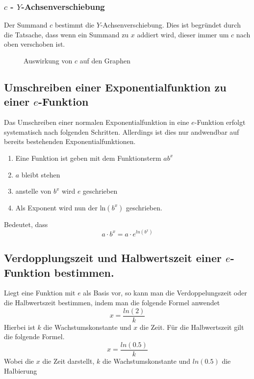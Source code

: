 \pagebreak
\subsubsection{$c$ - $Y$-Achsenverschiebung}\label{sec:e-Funktion/Umformung von der normalen Exponentialfunktion zu der E-Funktion/Normalform/c - Y-Achsenverschiebung}
Der Summand $c$ bestimmt die $Y$-Achsenverschiebung. Dies ist begründet durch die Tatsache, dass wenn ein Summand zu $x$ addiert wird, dieser immer um $c$ nach oben verschoben ist. 
\begin{figure}[h]
\centering
	\caption{Auswirkung von $c$ auf den Graphen}
\end{figure}
\pagebreak
\subsection{Umschreiben einer Exponentialfunktion zu einer $e$-Funktion}
Das Umschreiben einer normalen Exponentialfunktion in eine $e$-Funktion erfolgt systematisch nach folgenden Schritten. Allerdings ist dies nur andwendbar auf bereits bestehenden Exponentialfunktionen.
\begin{enumerate}
	\item Eine Funktion ist geben mit dem Funktionsterm $ab^x$
	\item $a$ bleibt stehen
	\item anstelle von $b^x$ wird $e$ geschrieben
	\item Als Exponent wird nun der $\mathrm {ln}(b^x)$ geschrieben. 
\end{enumerate}
Bedeutet, dass \[a\cdot b^x=a\cdot e^{ln(b^x)}\]

\subsection{Verdopplungszeit und Halbwertszeit einer $e$-Funktion bestimmen.}
Liegt eine Funktion mit $e$ als Basis vor, so kann man die Verdoppelungszeit oder die Halbwertszeit bestimmen, indem man die folgende Formel anwendet
\[x=\frac{ln(2)}{k}\]
Hierbei ist $k$ die Wachstumskonstante und $x$ die Zeit. Für die Halbwertszeit gilt die folgende Formel.
\[x=\frac{ln(0.5)}{k}\]
Wobei die $x$ die Zeit darstellt, $k$ die Wachstumskonstante und $ln(0.5)$ die Halbierung


